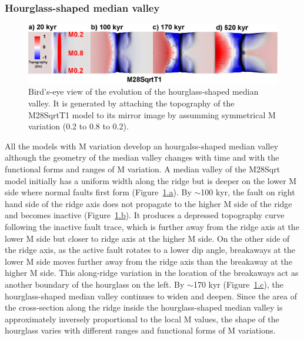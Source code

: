 \subsubsection{Hourglass-shaped median valley}

\begin{figure}[h]
  \centering
    \includegraphics[width=1.0\textwidth]{./Figures/fig_Results_3_2_hourglass_evolution.eps}
  \caption[Bird's-eye view of the evolution of the hourglass-shaped median valley.]{Bird's-eye view of the evolution of the hourglass-shaped median valley. It is generated by attaching the topography of the M28SqrtT1 model to its mirror image by assumming symmetrical M variation (0.2 to 0.8 to 0.2). }
 \label{fig_Results_3_2_hourglass_evolution}
\end{figure}

All the models with M variation develop an hourgalss-shaped median valley although the geometry of the median valley changes with time and with the functional forms and ranges of M variation. %
A median valley of the M28Sqrt model initially has a uniform width along the ridge but is deeper on the lower M side where normal faults first form (Figure~\hyperref[fig_Results_3_2_hourglass_evolution]{\ref{fig_Results_3_2_hourglass_evolution}.a}). By $\sim$100 kyr, the fault on right hand side of the ridge axis does not propagate to the higher M side of the ridge and becomes inactive (Figure~\hyperref[fig_Results_3_2_hourglass_evolution]{\ref{fig_Results_3_2_hourglass_evolution}.b}). It produces a depressed topography curve following the inactive fault trace, which is further away from the ridge axis at the lower M side but closer to ridge axis at the higher M side. On the other side of the ridge axis, as the active fault rotates to a lower dip angle, breakaways at the lower M side moves further away from the ridge axis than the breakaway at the higher M side. This along-ridge variation in the location of the breakaways act as another boundary of the hourglass on the left. %
By $\sim$170 kyr (Figure~\hyperref[fig_Results_3_2_hourglass_evolution]{\ref{fig_Results_3_2_hourglass_evolution}.c}), the hourglass-shaped median valley continues to widen and deepen. Since the area of the cross-section along the ridge inside the hourglass-shaped median valley is approximately inversely proportional to the local M values, the shape of the hourglass varies with different ranges and functional forms of M variations.

